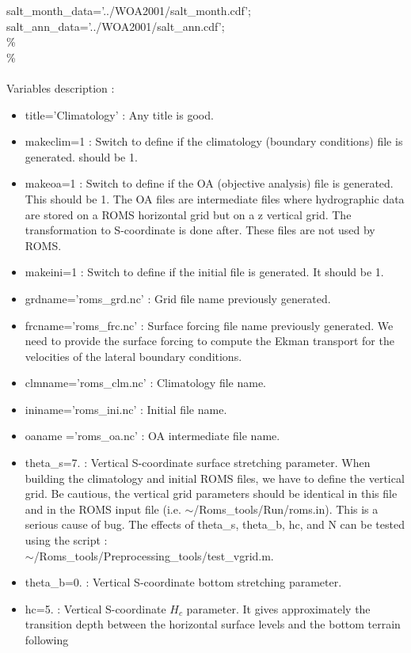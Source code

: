 salt\_month\_data='../WOA2001/salt\_month.cdf';\\
salt\_ann\_data='../WOA2001/salt\_ann.cdf';\\
\%\\
\%\\
\\
Variables description :
\begin{itemize}
\item title='Climatology' : Any title is good.
\item makeclim=1 : Switch to define if the climatology
 (boundary conditions) file is generated. should be 1.
\item makeoa=1 : Switch to define if the OA (objective analysis)
 file is generated. This should be 1. The OA files are intermediate files
 where hydrographic data are stored on a ROMS horizontal grid but on
 a z vertical grid. The transformation to S-coordinate is done after.
 These files are not used by ROMS.
\item makeini=1 : Switch to define if the initial file is generated. 
It should be 1.
\item grdname='roms\_grd.nc' : Grid file name previously generated.
\item frcname='roms\_frc.nc' : Surface forcing file name previously 
generated. We need to provide the surface forcing to compute the Ekman 
transport for the velocities of the lateral boundary conditions.
\item clmname='roms\_clm.nc' : Climatology file name.
\item ininame='roms\_ini.nc' : Initial file name.
\item oaname ='roms\_oa.nc' : OA intermediate file name.
\item theta\_s=7. : Vertical S-coordinate surface stretching parameter. 
When building the climatology and initial ROMS files, we have to define
the vertical grid. Be cautious, the vertical grid parameters should be 
identical in this file and in the ROMS input file (i.e. 
$\sim$/Roms\_tools/Run/roms.in).
This is a serious cause of bug.
The effects of theta\_s, theta\_b, hc, and N can be tested 
using the script : \\
$\sim$/Roms\_tools/Preprocessing\_tools/test\_vgrid.m.
\item theta\_b=0. : Vertical S-coordinate bottom stretching parameter.
\item hc=5. : Vertical S-coordinate $H_c$ parameter. It gives approximately the
transition depth between the horizontal surface levels and the bottom terrain following

\end{itemize}
